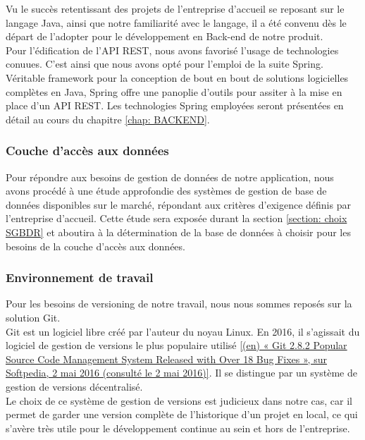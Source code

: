 \begin{spacing}{1.5}
Vu le succès retentissant des projets de l'entreprise d'accueil se reposant sur le langage Java, ainsi que notre familiarité avec le langage, il a été convenu dès le départ de l'adopter pour le développement en Back-end de notre produit.\\
Pour l'édification de l'API REST, nous avons favorisé l'usage de technologies conuues. C'est ainsi que nous avons opté pour l'emploi de la suite Spring. Véritable framework pour la conception de bout en bout de solutions logicielles complètes en Java, Spring offre une panoplie d'outils pour assiter à la mise en place d'un API REST. Les technologies Spring employées seront présentées en détail au cours du chapitre \ref{chap: BACKEND}.


\subsubsection*{Couche d'accès aux données}%
Pour répondre aux besoins de gestion de données de notre application, nous avons procédé à une étude approfondie des systèmes de gestion de base de données disponibles sur le marché, répondant aux critères d'exigence définis par l'entreprise d'accueil. Cette étude sera exposée durant la section \ref{section: choix SGBDR} et aboutira à la détermination de la base de données à choisir pour les besoins de la couche d'accès aux données.

\subsubsection*{Environnement de travail}%
Pour les besoins de versioning de notre travail, nous nous sommes reposés sur la solution Git.\\
Git est un logiciel libre créé par l'auteur du noyau Linux. En 2016, il s’agissait du logiciel de gestion de versions le plus populaire utilisé \ref{(en) « Git 2.8.2 Popular Source Code Management System Released with Over 18 Bug Fixes », sur Softpedia, 2 mai 2016 (consulté le 2 mai 2016)}. Il se distingue par un système de gestion de versions décentralisé.\\
Le choix de ce système de gestion de versions est judicieux dans notre cas, car il permet de garder une version complète de l'historique d'un projet en local, ce qui s'avère très utile pour le développement continue au sein et hors de l'entreprise.\\


\end{spacing}
